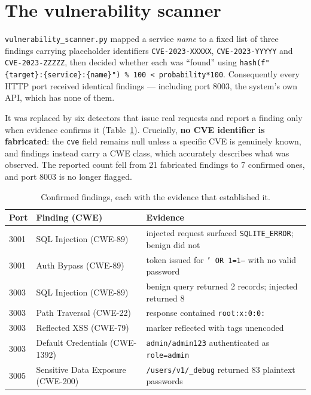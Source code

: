 \documentclass[11pt,a4paper]{report}
\newcommand{\code}[1]{\texttt{\small #1}}
\begin{document}
\section{The vulnerability scanner}
\code{vulnerability\_scanner.py} mapped a service \emph{name} to a fixed list of
three findings carrying placeholder identifiers \code{CVE-2023-XXXXX},
\code{CVE-2023-YYYYY} and \code{CVE-2023-ZZZZZ}, then decided whether each was
``found'' using
\code{hash(f"\{target\}:\{service\}:\{name\}") \% 100 < probability*100}.
Consequently every HTTP port received identical findings --- including port
8003, the system's own API, which has none of them.

It was replaced by six detectors that issue real requests and report a finding
only when evidence confirms it (Table~\ref{tab:vulns}). Crucially, \textbf{no
CVE identifier is fabricated}: the \code{cve} field remains null unless a
specific CVE is genuinely known, and findings instead carry a CWE class, which
accurately describes what was observed. The reported count fell from 21
fabricated findings to 7 confirmed ones, and port 8003 is no longer flagged.

\begin{table}[h]
\centering
\caption{Confirmed findings, each with the evidence that established it.}
\label{tab:vulns}
\small
\begin{tabularx}{\textwidth}{llX}
\toprule
\textbf{Port} & \textbf{Finding (CWE)} & \textbf{Evidence}\\
\midrule
3001 & SQL Injection (CWE-89) & injected request surfaced \code{SQLITE\_ERROR}; benign did not\\
3001 & Auth Bypass (CWE-89) & token issued for \code{' OR 1=1--} with no valid password\\
3003 & SQL Injection (CWE-89) & benign query returned 2 records; injected returned 8\\
3003 & Path Traversal (CWE-22) & response contained \code{root:x:0:0:}\\
3003 & Reflected XSS (CWE-79) & marker reflected with tags unencoded\\
3003 & Default Credentials (CWE-1392) & \code{admin/admin123} authenticated as \code{role=admin}\\
3005 & Sensitive Data Exposure (CWE-200) & \code{/users/v1/\_debug} returned 83 plaintext passwords\\
\bottomrule
\end{tabularx}
\end{table}
\end{document}

